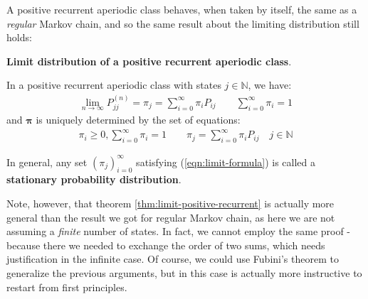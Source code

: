 \documentclass[../template.tex]{subfiles}
\begin{document}
A positive recurrent aperiodic class behaves, when taken by itself, the same as a \textit{regular} Markov chain, and so the same result about the limiting distribution still holds:

\begin{thm} \textbf{Limit distribution of a positive recurrent aperiodic class}.\label{thm:limit-positive-recurrent}
    
    In a positive recurrent aperiodic class with states $j\in \mathbb{N}$, we have:
    \begin{align*}
        \lim_{n \to \infty} P_{j j}^{(n)} = \pi_j = \sum_{i=0}^\infty \pi_i P_{ij} \qquad \sum_{i = 0}^\infty \pi_i = 1
    \end{align*}
    and $\bm{\pi}$ is uniquely determined by the set of equations:
    \begin{align}\label{eqn:limit-formula}
        \pi_i \geq 0, \sum_{i=0}^\infty \pi_i = 1 \qquad \pi_j = \sum_{i=0}^\infty \pi_i P_{ij} \quad j \in \mathbb{N}
    \end{align}
\end{thm}
In general, any set $(\pi_j)_{i=0}^\infty$ satisfying (\ref{eqn:limit-formula}) is called a \textbf{stationary probability distribution}. 

\medskip

Note, however, that theorem \ref{thm:limit-positive-recurrent} is actually more general than the result we got for regular Markov chain, as here we are not assuming a \textit{finite} number of states. In fact, we cannot employ the same proof - because there we needed to exchange the order of two sums, which needs justification in the infinite case. Of course, we could use Fubini's theorem to generalize the previous arguments, but in this case is actually more instructive to restart from first principles.
\end{document}

